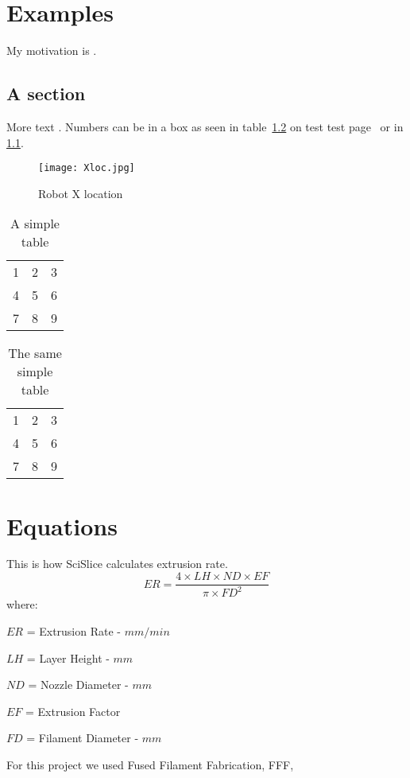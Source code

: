 \documentclass[main.tex]{subfiles}
\begin{document}
\chapter{Examples}
My motivation is \cite{einstein}.
\section{A section}
More text \cite{knuthwebsite}. Numbers can be in a box \cite{Singamneni2012} as seen in table~\ref{tab:box2} on test test page~\pageref{tab:box2} or in \ref{fig:xloc}.
\begin{figure}[h]
	\centering
	\texttt{[image: Xloc.jpg]}
	\caption{Robot X location}
	\label{fig:xloc}
\end{figure}

\begin{table}
  \centering
    \begin{tabular}{| l c r |}
    \hline
    1 & 2 & 3 \\
    4 & 5 & 6 \\
    7 & 8 & 9 \\
    \hline
    \end{tabular}
  \caption{A simple table}
  \label{tab:box1}
\end{table}

\begin{table}
  \centering
    \begin{tabular}{| l c r |}
    \hline
    1 & 2 & 3 \\
    4 & 5 & 6 \\
    7 & 8 & 9 \\
    \hline
    \end{tabular}
  \caption{The same simple table}
  \label{tab:box2}
\end{table}

\lipsum[1-6]

\chapter{Equations}
This is how SciSlice calculates extrusion rate.
$$
ER = \frac{4 \times LH \times ND \times EF}{\pi \times FD^2}
$$
where:

$ER$ = Extrusion Rate - $mm/min$

$LH$ = Layer Height - $mm$

$ND$ = Nozzle Diameter - $mm$

$EF$ = Extrusion Factor

$FD$ = Filament Diameter - $mm$
 
For this project we used Fused Filament Fabrication, FFF,
\printnomenclature
\end{document}
